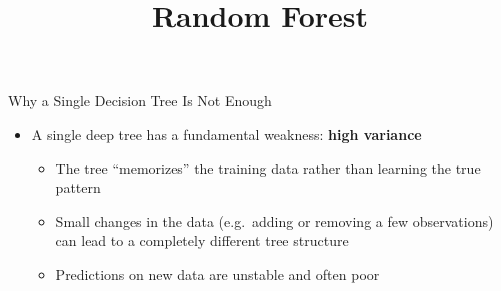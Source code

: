 \documentclass[hyperref={pdfpagelabels=false}]{beamer}
\begin{document}
\title[]
{Random Forest}

\author{}
\institute{}
\date{}

\begin{frame}{}
	\titlepage
\end{frame}




\begin{frame}{Why a Single Decision Tree Is Not Enough}
	\begin{itemize}
		\item A single deep tree has a fundamental weakness: \textbf{high variance}
		\vspace{0.2cm}
		\begin{itemize}
			\item The tree ``memorizes'' the training data rather than learning the true pattern
			\vspace{0.2cm}
			\item Small changes in the data (e.g.\ adding or removing a few observations) can lead to a completely different tree structure
			\vspace{0.2cm}
			\item Predictions on new data are unstable and often poor
		\end{itemize}
	\end{itemize}
\end{frame}
\end{document}
